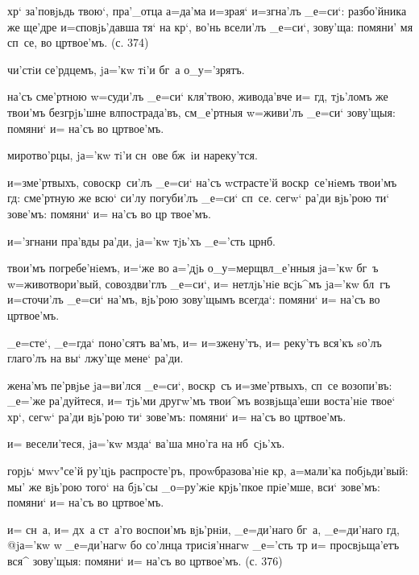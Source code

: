 
 хр` за'повjьдь твою`, пра'_отца 
а=да'ма и=з\ъ рая` и=згна'лъ _е=си`: разбо'йника же 
ще'дре и=сповjь'давша тя` на кр`, во'нь всели'лъ 
_е=си`, зову'ща: помяни' мя сп~се, во цр твое'мъ. 
(с. 374)

  чи'стiи се'рдцемъ, jа='кw тi'и 
бг~а о_у='зрятъ.

 на'съ сме'ртною w=суди'лъ _е=си` 
кля'твою, живода'вче и= гд, тjь'ломъ же твои'мъ 
безгрjь'шне вл пострада'въ, см_е'ртныя w=живи'лъ 
_е=си` зову'щыя: помяни` и= на'съ во цр твое'мъ.

  миротво'рцы, jа='кw тi'и сн~ове 
бж~iи нареку'тся.

 и=з\ъ ме'ртвыхъ, совоскр~си'лъ _е=си` 
на'съ w\т страсте'й воскр~се'нiемъ твои'мъ гд: 
сме'ртную же всю` си'лу погуби'лъ _е=си` сп~се. сегw` 
ра'ди вjь'рою ти` зове'мъ: помяни` и= на'съ во цр 
твое'мъ.

  и='згнани пра'вды ра'ди, jа='кw 
тjь'хъ _е='сть цр нб.

 твои'мъ погребе'нiемъ, и=`же во 
а='дjь о_у=мерщвл_е'нныя jа='кw бг~ъ w=животвори'вый, 
совоздви'глъ _е=си`, и= нетлjь'нiе всjь^мъ jа='кw бл~гъ 
и=сточи'лъ _е=си` на'мъ, вjь'рою зову'щымъ всегда`: 
помяни` и= на'съ во цр твое'мъ.

  _е=сте`, _е=гда` поно'сятъ ва'мъ, 
и= и=зжену'тъ, и= реку'тъ вся'къ sо'лъ глаго'лъ на вы` 
лжу'ще мене` ра'ди.

 жена'мъ пе'рвjье jа=ви'лся _е=си`, 
воскр~съ и=з\ъ ме'ртвыхъ, сп~се возопи'въ: _е='же 
ра'дуйтеся, и= тjь'ми другw'мъ твои^мъ возвjьща'еши 
воста'нiе твое` хр`, сегw` ра'ди вjь'рою ти` зове'мъ: 
помяни` и= на'съ во цр твое'мъ.

  и= весели'теся, jа='кw мзда` 
ва'ша мно'га на нб~сjь'хъ.

 горjь` мwv"се'й ру'цjь распросте'ръ, 
проwбразова'нiе кр, а=мали'ка побjьди'вый: мы' же 
вjь'рою того` на бjь'сы _о=ру'жiе крjь'пкое прiе'мше, 
вси` зове'мъ: помяни` и= на'съ во цр твое'мъ.

  и= сн~а, и= дх~а ст~а'го воспои'мъ 
вjь'рнiи, _е=ди'наго бг~а, _е=ди'наго гд, @jа='кw w\т 
_е=ди'нагw бо со'лнца трисiя'ннагw _е='сть 
тр и= просвjьща'етъ вся^ зову'щыя: помяни` 
и= на'съ во цр твое'мъ. (с. 376)

